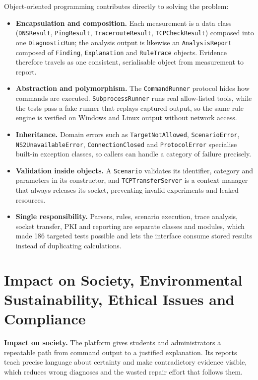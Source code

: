 \documentclass[12pt,a4paper]{report}
\numberwithin{equation}{chapter}
\newcommand{\testCount}{186}
\begin{document}
Object-oriented programming contributes directly to solving the problem:
\begin{sloppypar}
\begin{itemize}
  \item \textbf{Encapsulation and composition.} Each measurement is a data class (\texttt{DNSResult}, \texttt{PingResult}, \texttt{TracerouteResult}, \texttt{TCPCheckResult}) composed into one \texttt{DiagnosticRun}; the analysis output is likewise an \texttt{AnalysisReport} composed of \texttt{Finding}, \texttt{Explanation} and \texttt{RuleTrace} objects. Evidence therefore travels as one consistent, serialisable object from measurement to report.
  \item \textbf{Abstraction and polymorphism.} The \texttt{CommandRunner} protocol hides how commands are executed. \texttt{SubprocessRunner} runs real allow-listed tools, while the tests pass a fake runner that replays captured output, so the same rule engine is verified on Windows and Linux output without network access.
  \item \textbf{Inheritance.} Domain errors such as \texttt{TargetNotAllowed}, \texttt{ScenarioError}, \texttt{NS2UnavailableError}, \texttt{ConnectionClosed} and \texttt{ProtocolError} specialise built-in exception classes, so callers can handle a category of failure precisely.
  \item \textbf{Validation inside objects.} A \texttt{Scenario} validates its identifier, category and parameters in its constructor, and \texttt{TCPTransferServer} is a context manager that always releases its socket, preventing invalid experiments and leaked resources.
  \item \textbf{Single responsibility.} Parsers, rules, scenario execution, trace analysis, socket transfer, PKI and reporting are separate classes and modules, which made \testCount{} targeted tests possible and lets the interface consume stored results instead of duplicating calculations.
\end{itemize}
\end{sloppypar}

\section{Impact on Society, Environmental Sustainability, Ethical Issues and Compliance}
\noindent\textbf{Impact on society.} The platform gives students and administrators a repeatable path from command output to a justified explanation. Its reports teach precise language about certainty and make contradictory evidence visible, which reduces wrong diagnoses and the wasted repair effort that follows them.
\end{document}
